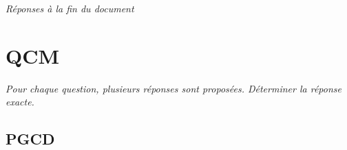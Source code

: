 \documentclass{cornouaille}
\begin{document}

\tableofcontents

\begin{center}
	\emph{Réponses à la fin du document}

\end{center}

\section{QCM}

\emph{Pour chaque question, plusieurs réponses sont proposées. Déterminer la réponse exacte.}

\subsection{PGCD}
\end{document}
